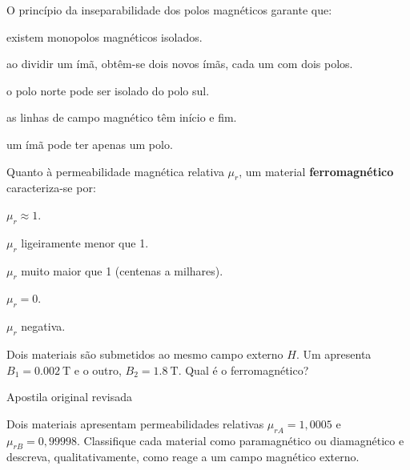 \blocofixacao
\begin{questao}[1]{}

O princípio da inseparabilidade dos polos magnéticos garante que:
\begin{alternativas}
\item existem monopolos magnéticos isolados.
\item ao dividir um ímã, obtêm-se dois novos ímãs, cada um com dois polos.
\item o polo norte pode ser isolado do polo sul.
\item as linhas de campo magnético têm início e fim.
\item um ímã pode ter apenas um polo.
\end{alternativas}


\end{questao}
\begin{questao}[1]{}

Quanto à permeabilidade magnética relativa $\mu_r$, um material
\textbf{ferromagnético} caracteriza-se por:
\begin{alternativas}
\item $\mu_r \approx 1$.
\item $\mu_r$ ligeiramente menor que 1.
\item $\mu_r$ muito maior que 1 (centenas a milhares).
\item $\mu_r = 0$.
\item $\mu_r$ negativa.
\end{alternativas}


\end{questao}
\begin{questao}[1]{}

Dois materiais são submetidos ao mesmo campo externo $H$. Um apresenta
$B_1 = \SI{0.002}{\tesla}$ e o outro, $B_2 = \SI{1.8}{\tesla}$. Qual é o
ferromagnético?


\end{questao}
\begin{questao}[1]{Apostila original revisada}

Dois materiais apresentam permeabilidades relativas
$\mu_{rA}=1{,}0005$ e $\mu_{rB}=0{,}99998$. Classifique cada material como
paramagnético ou diamagnético e descreva, qualitativamente, como reage a um campo
magnético externo.


\end{questao}

